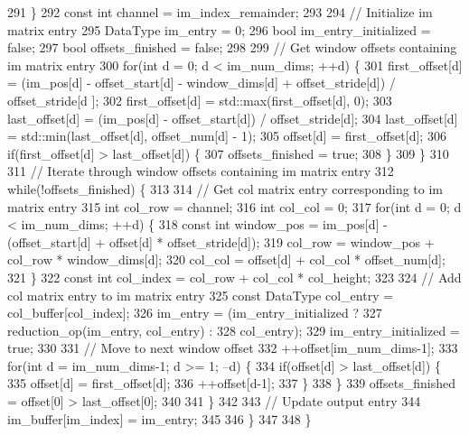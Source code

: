 \begin{DoxyCode}
291     \}
292     \textcolor{keyword}{const} \textcolor{keywordtype}{int} channel = im\_index\_remainder;
293 
294     \textcolor{comment}{// Initialize im matrix entry}
295     DataType im\_entry = 0;
296     \textcolor{keywordtype}{bool} im\_entry\_initialized = \textcolor{keyword}{false};
297     \textcolor{keywordtype}{bool} offsets\_finished = \textcolor{keyword}{false};
298 
299     \textcolor{comment}{// Get window offsets containing im matrix entry}
300     \textcolor{keywordflow}{for}(\textcolor{keywordtype}{int} d = 0; d < im\_num\_dims; ++d) \{
301       first\_offset[d] = (im\_pos[d] - offset\_start[d] - window\_dims[d] + offset\_stride[d]) / offset\_stride[d
      ];
302       first\_offset[d] = std::max(first\_offset[d], 0);
303       last\_offset[d] = (im\_pos[d] - offset\_start[d]) / offset\_stride[d];
304       last\_offset[d] = std::min(last\_offset[d], offset\_num[d] - 1);
305       offset[d] = first\_offset[d];
306       \textcolor{keywordflow}{if}(first\_offset[d] > last\_offset[d]) \{
307         offsets\_finished = \textcolor{keyword}{true};
308       \}
309     \}
310 
311     \textcolor{comment}{// Iterate through window offsets containing im matrix entry}
312     \textcolor{keywordflow}{while}(!offsets\_finished) \{
313 
314       \textcolor{comment}{// Get col matrix entry corresponding to im matrix entry}
315       \textcolor{keywordtype}{int} col\_row = channel;
316       \textcolor{keywordtype}{int} col\_col = 0;
317       \textcolor{keywordflow}{for}(\textcolor{keywordtype}{int} d = 0; d < im\_num\_dims; ++d) \{
318         \textcolor{keyword}{const} \textcolor{keywordtype}{int} window\_pos = im\_pos[d] - (offset\_start[d] + offset[d] * offset\_stride[d]);
319         col\_row = window\_pos + col\_row * window\_dims[d];
320         col\_col = offset[d] + col\_col * offset\_num[d];
321       \}
322       \textcolor{keyword}{const} \textcolor{keywordtype}{int} col\_index = col\_row + col\_col * col\_height;
323 
324       \textcolor{comment}{// Add col matrix entry to im matrix entry}
325       \textcolor{keyword}{const} DataType col\_entry = col\_buffer[col\_index];
326       im\_entry = (im\_entry\_initialized ?
327                   reduction\_op(im\_entry, col\_entry) :
328                   col\_entry);
329       im\_entry\_initialized = \textcolor{keyword}{true};
330 
331       \textcolor{comment}{// Move to next window offset}
332       ++offset[im\_num\_dims-1];
333       \textcolor{keywordflow}{for}(\textcolor{keywordtype}{int} d = im\_num\_dims-1; d >= 1; --d) \{
334         \textcolor{keywordflow}{if}(offset[d] > last\_offset[d]) \{
335           offset[d] = first\_offset[d];
336           ++offset[d-1];
337         \}
338       \}
339       offsets\_finished = offset[0] > last\_offset[0];
340       
341     \}
342 
343     \textcolor{comment}{// Update output entry}
344     im\_buffer[im\_index] = im\_entry;
345 
346   \}
347 
348 \}
\end{DoxyCode}
